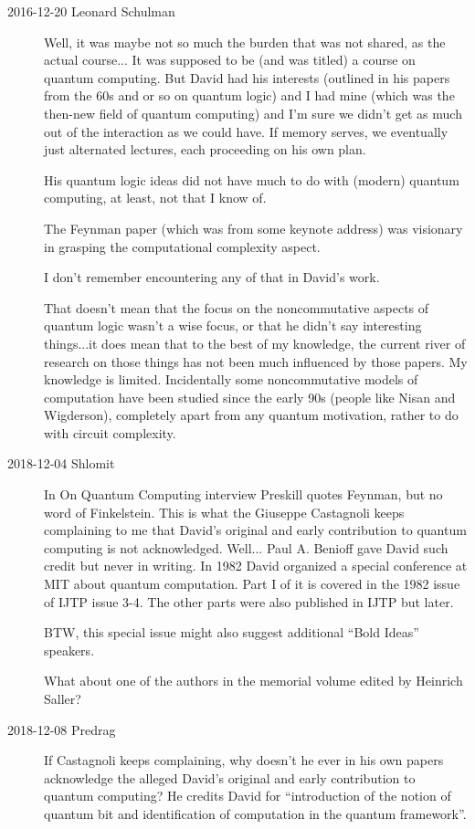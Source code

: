 \begin{description}
\item[2016-12-20 Leonard Schulman]
Well, it was maybe not so much the burden that was not shared,
as the actual course... It was supposed to be (and was titled) a course
on quantum computing. But David had his interests (outlined in his
papers from the 60s and or so on quantum logic) and I had mine (which
was the then-new field of quantum computing) and I'm sure we didn't get
as much out of the interaction as we could have. If memory serves, we
eventually just alternated lectures, each proceeding on his own plan.

His quantum logic ideas did not have much to do with (modern) quantum computing,
at least, not that I know of.

The Feynman paper (which was from some keynote address) was
visionary in grasping the computational complexity aspect.

I don't remember encountering any of that in David's work.

That doesn't mean that the focus on the noncommutative aspects of quantum logic
wasn't a wise focus, or that he didn't say interesting things...it does mean that
to the best of my knowledge, the current river of research on those things has
not been much influenced by those papers. My knowledge is limited. Incidentally
some noncommutative models of computation have been studied since the early 90s
(people like Nisan and Wigderson), completely apart from any quantum motivation,
rather to do with circuit complexity.

\item[2018-12-04 Shlomit]
In 
   {On Quantum Computing} interview
Preskill quotes Feynman, but no word of Finkelstein. This is what the Giuseppe
Castagnoli keeps complaining to me
that David's original and early contribution to quantum computing is not
acknowledged. Well... Paul A. Benioff gave David such
credit but never in writing.
In 1982 David organized a special conference at MIT about quantum computation.
Part I of it is covered in the 1982 issue of IJTP
 {issue 3-4}. The other parts
were also published in IJTP but later.

BTW, this special issue might also suggest additional ``Bold Ideas'' speakers.

What about one of the authors in the
 {memorial volume} edited by
Heinrich Saller?

\item[2018-12-08 Predrag]
If Castagnoli keeps complaining, why doesn't he ever in his own papers
acknowledge the alleged David's original and early contribution to quantum
computing?
He credits David for ``introduction of the notion of quantum bit
and identification of computation in the quantum framework''.


\end{description}

